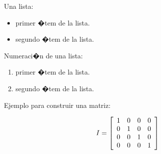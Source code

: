 \documentclass[letterpaper,12pt,onecolumn,titlepage]{article}
\begin{document}
Una lista: 
 
\begin{itemize}
 \item primer �tem de la lista.
 \item segundo �tem de la lista.
\end{itemize}
 
Numeraci�n de una lista:
 
\begin{enumerate}
\item primer �tem de la lista.
\item segundo �tem de la lista.
\end{enumerate}


 
Ejemplo para construir una matriz:
 
$$I = \left[
\begin{array}{c c c c c}
        1    &    0    &    0    &    0    \\
        0    &    1    &    0    &    0    \\
        0    &    0    &    1    &    0    \\
        0    &    0    &    0    &    1
\end{array} \right]$$
 

\end{document}
